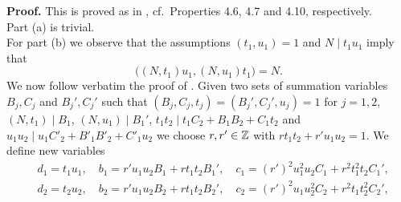 \documentclass[11pt]{amsart}
\theoremstyle{plain}
\numberwithin{equation}{section}
\theoremstyle{definition}
\begin{document}
\textbf{Proof.} This is proved as in   \cite[Section 4]{BFG}, cf.\ Properties 4.6,  4.7 and 4.10, respectively. \\
 Part (a) is trivial. \\
For part (b) we observe that the   assumptions $(t_1, u_1) = 1$ and $N \mid t_1u_1$ imply that 
\begin{equation}\label{gcd-new}
\big((N, t_1)u_1, (N, u_1)t_1\big) = N.
\end{equation}
We now follow verbatim the proof of \cite[Property 4.7]{BFG}. Given two sets of summation variables $B_j, C_j$ and $B_j', C_j'$ such that $(B_j, C_j, t_j) = (B_j', C_j', u_j) = 1$ for $j=1, 2$, $(N, t_1) \mid B_1$, $(N, u_1) \mid B_1'$, $t_1t_2 \mid t_1C_2 + B_1B_2 + C_1 t_2$ and $u_1u_2 \mid u_1C'_2 + B'_1B'_2 + C'_1 u_2$ we choose $r, r' \in \Bbb{Z}$ with $rt_1t_2 + r' u_1u_2 = 1$. We   define new variables 
\begin{displaymath}
\begin{split}
&  d_1 = t_1u_1, \quad b_1 = r' u_1u_2B_1 + r t_1t_2 B_1', \quad c_1 = (r')^2 u_1^2 u_2 C_1 + r^2 t_1^2 t_2 C_1',\\
 & d_2 = t_2u_2, \quad b_2 = r' u_1u_2B_2 + r t_1t_2 B_2', \quad c_2 = (r')^2 u_1 u_2^2 C_2 + r^2 t_1 t_2^2 C_2',\\
\end{split}
\end{displaymath}
\end{document}
